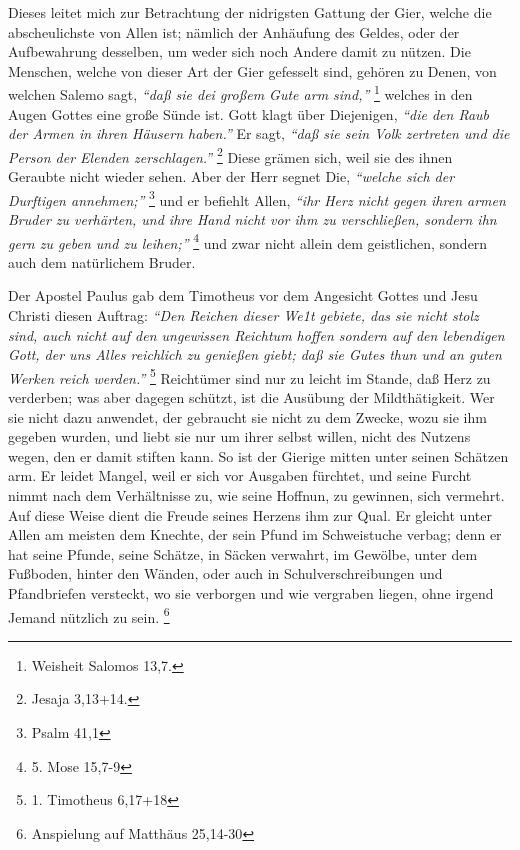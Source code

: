 Dieses leitet mich zur Betrachtung der nidrigsten Gattung der Gier, welche die
abscheulichste von Allen ist; nämlich der Anhäufung des Geldes, oder der
Aufbewahrung desselben, um weder sich noch Andere damit zu nützen. Die Menschen,
welche von dieser Art der Gier gefesselt sind, gehören zu Denen, von welchen
Salemo sagt,
\textit{"`daß sie dei großem Gute arm sind,"'}
\footnote{Weisheit Salomos 13,7.}
welches in den Augen Gottes eine große Sünde ist. Gott klagt über Diejenigen,
\textit{"`die den Raub der Armen in ihren Häusern haben."'} Er sagt, \textit{"`daß sie sein Volk
zertreten und die Person der Elenden zerschlagen."'}
\footnote{Jesaja 3,13+14.}
Diese grämen sich, weil sie des ihnen Geraubte nicht wieder sehen. Aber der Herr
segnet Die, \textit{"`welche sich der Durftigen annehmen;"'}
\footnote{Psalm 41,1}
und er
befiehlt Allen,
\textit{"`ihr Herz nicht gegen ihren armen Bruder zu verhärten, und ihre
Hand nicht vor ihm zu verschließen, sondern ihn gern zu geben und zu
leihen;"'}
\footnote{5. Mose 15,7-9}
und zwar nicht allein dem geistlichen,
sondern auch dem natürlichem Bruder.

\medskip

Der Apostel Paulus gab dem Timotheus vor dem Angesicht Gottes und Jesu Christi
diesen Auftrag:
\textit{"`Den Reichen dieser We1t gebiete, das sie nicht stolz sind,
auch nicht auf den ungewissen Reichtum hoffen sondern auf den lebendigen Gott,
der uns Alles reichlich zu genießen giebt; daß sie Gutes thun und an guten
Werken reich werden."'}
\footnote{1. Timotheus 6,17+18}
Reichtümer sind nur zu leicht
im Stande, daß Herz zu verderben; was aber dagegen schützt, ist die Ausübung der
Mildthätigkeit. Wer sie nicht dazu anwendet, der gebraucht sie nicht zu dem
Zwecke, wozu sie ihm gegeben wurden, und liebt sie nur um ihrer selbst willen,
nicht des Nutzens wegen, den er damit stiften kann. So ist der Gierige mitten
unter seinen Schätzen arm. Er leidet Mangel, weil er sich vor Ausgaben fürchtet,
und seine Furcht nimmt nach dem Verhältnisse zu, wie seine Hoffnun, zu gewinnen,
sich vermehrt. Auf diese Weise dient die Freude seines Herzens ihm zur Qual. Er
gleicht unter Allen am meisten dem Knechte, der sein Pfund im Schweistuche
verbag; denn er hat seine Pfunde, seine Schätze, in Säcken verwahrt, im Gewölbe,
unter dem Fußboden, hinter den Wänden, oder auch in Schulverschreibungen und
Pfandbriefen versteckt, wo sie verborgen und wie vergraben liegen, ohne irgend
Jemand nützlich zu sein.
\footnote{Anspielung auf Matthäus 25,14-30}

